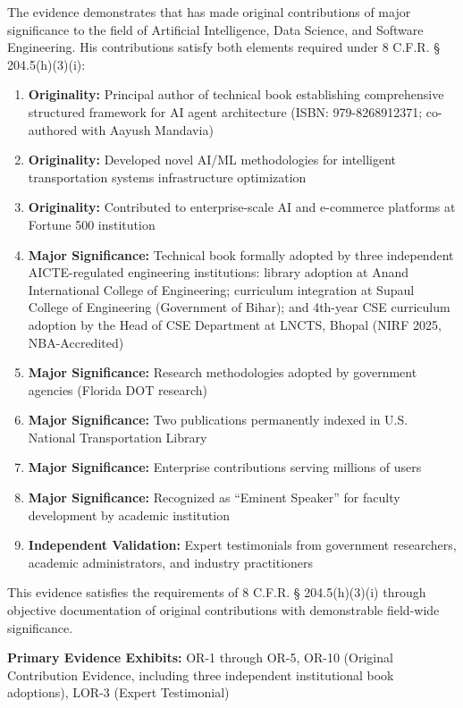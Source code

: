 The evidence demonstrates that \dr has made original contributions of major significance to the field of Artificial Intelligence, Data Science, and Software Engineering. His contributions satisfy both elements required under 8 C.F.R. § 204.5(h)(3)(i):

\begin{enumerate}
    \item [$\checkmark$] \textbf{Originality:} Principal author of technical book establishing comprehensive structured framework for AI agent architecture (ISBN: 979-8268912371; co-authored with Aayush Mandavia)
    \item [$\checkmark$] \textbf{Originality:} Developed novel AI/ML methodologies for intelligent transportation systems infrastructure optimization
    \item [$\checkmark$] \textbf{Originality:} Contributed to enterprise-scale AI and e-commerce platforms at Fortune 500 institution
    \item [$\checkmark$] \textbf{Major Significance:} Technical book formally adopted by three independent AICTE-regulated engineering institutions: library adoption at Anand International College of Engineering; curriculum integration at Supaul College of Engineering (Government of Bihar); and 4th-year CSE curriculum adoption by the Head of CSE Department at LNCTS, Bhopal (NIRF 2025, NBA-Accredited)
    \item [$\checkmark$] \textbf{Major Significance:} Research methodologies adopted by government agencies (Florida DOT research)
    \item [$\checkmark$] \textbf{Major Significance:} Two publications permanently indexed in U.S. National Transportation Library
    \item [$\checkmark$] \textbf{Major Significance:} Enterprise contributions serving millions of users
    \item [$\checkmark$] \textbf{Major Significance:} Recognized as ``Eminent Speaker'' for faculty development by academic institution
    \item [$\checkmark$] \textbf{Independent Validation:} Expert testimonials from government researchers, academic administrators, and industry practitioners
\end{enumerate}

This evidence satisfies the requirements of 8 C.F.R. § 204.5(h)(3)(i) through objective documentation of original contributions with demonstrable field-wide significance.

\textbf{Primary Evidence Exhibits:} OR-1 through OR-5, OR-10 (Original Contribution Evidence, including three independent institutional book adoptions), LOR-3 (Expert Testimonial)


